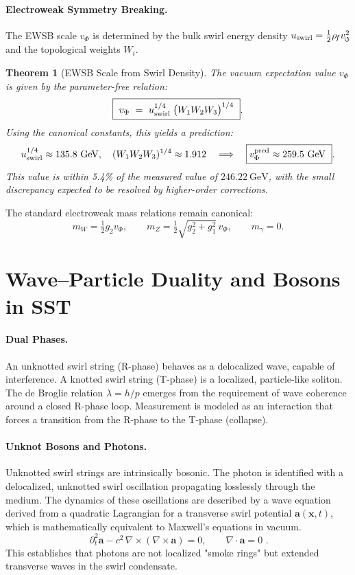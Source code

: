 \documentclass[11pt]{article}
\newcommand{\swirlarrow}{%
    \mathchoice{\mkern-2mu\scriptstyle\boldsymbol{\circlearrowleft}}%
    {\mkern-2mu\scriptstyle\boldsymbol{\circlearrowleft}}%
    {\mkern-2mu\scriptscriptstyle\boldsymbol{\circlearrowleft}}%
    {\mkern-2mu\scriptscriptstyle\boldsymbol{\circlearrowleft}}%
}
\newcommand{\vscore}{v_{\swirlarrow}}                    %
\newcommand{\rhof}{\rho_{\!f}}                           %
\newtheorem{theorem}{Theorem}[section]
\begin{document}
    \paragraph{Electroweak Symmetry Breaking.}
        The EWSB scale $v_\Phi$ is determined by the bulk swirl energy density $u_{\rm swirl} = \frac{1}{2}\rhof\vscore^2$ and the topological weights $W_i$.
        \begin{theorem}[EWSB Scale from Swirl Density]
        The vacuum expectation value $v_\Phi$ is given by the parameter-free relation:
        \[ \boxed{\ v_\Phi\ =\ u_{\rm swirl}^{1/4}\;\big(W_1 W_2 W_3\big)^{1/4}\ }. \]
        Using the canonical constants, this yields a prediction:
        \[ u_{\rm swirl}^{1/4} \approx 135.8~\mathrm{GeV}, \quad (W_1W_2W_3)^{1/4} \approx 1.912 \quad \Longrightarrow \quad \boxed{ v_\Phi^{\rm pred} \approx 259.5\ \mathrm{GeV}\ }. \]
        This value is within 5.4\% of the measured value of $246.22~\mathrm{GeV}$, with the small discrepancy expected to be resolved by higher-order corrections.
        \end{theorem}

        The standard electroweak mass relations remain canonical:
        \[ m_W=\tfrac12 g_2 v_\Phi,\qquad m_Z=\tfrac12\sqrt{g_2^2+g_1^2}\,v_\Phi,\qquad m_\gamma=0. \]


\section{Wave–Particle Duality and Bosons in SST}
\label{sec:wave_particle_duality}
\paragraph{Dual Phases.}
    An unknotted swirl string (R-phase) behaves as a delocalized wave, capable of interference. A knotted swirl string (T-phase) is a localized, particle-like soliton. The de Broglie relation $\lambda = h/p$ emerges from the requirement of wave coherence around a closed R-phase loop. Measurement is modeled as an interaction that forces a transition from the R-phase to the T-phase (collapse).

\paragraph{Unknot Bosons and Photons.}
    Unknotted swirl strings are intrinsically bosonic. The photon is identified with a delocalized, unknotted swirl oscillation propagating losslessly through the medium. The dynamics of these oscillations are described by a wave equation derived from a quadratic Lagrangian for a transverse swirl potential $\mathbf{a}(\mathbf{x}, t)$, which is mathematically equivalent to Maxwell's equations in vacuum.
    \[ \boxed{\,\partial_t^2 \mathbf{a} - c^2\,\nabla\times(\nabla\times \mathbf{a}) = 0, \qquad \nabla\cdot \mathbf{a}=0\,}\,. \]
    This establishes that photons are not localized "smoke rings" but extended transverse waves in the swirl condensate.
\end{document}
